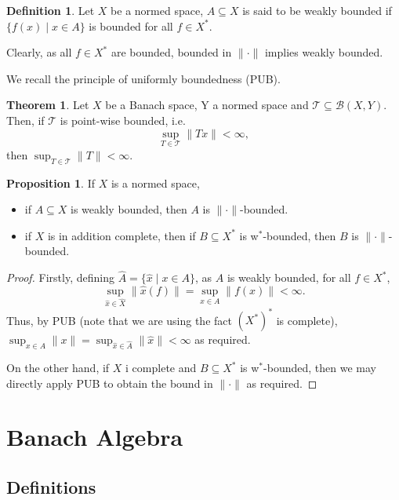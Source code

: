 \documentclass[]{article}
\theoremstyle{definition}
\newtheorem{theorem}{Theorem}
\newtheorem{definition}{Definition}[section]
\newtheorem{proposition}{Proposition}[section]
\begin{document}
\begin{definition}
  Let \(X\) be a normed space, \(A \subseteq X\) is said to be weakly bounded if 
  \(\{f(x) \mid x \in A\}\) is bounded for all \(f \in X^*\).
\end{definition}

Clearly, as all \(f \in X^*\) are bounded, bounded in \(\|\cdot\|\) implies weakly bounded.

We recall the principle of uniformly boundedness (PUB).

\begin{theorem}
  Let \(X\) be a Banach space, Y a normed space and \(\mathcal{T} \subseteq \mathcal{B}(X, Y)\). 
  Then, if \(\mathcal{T}\) is point-wise bounded, i.e. 
  \[\sup_{T \in \mathcal{T}} \|Tx\| < \infty,\]
  then \(\sup_{T \in \mathcal{T}} \|T\| < \infty\).
\end{theorem}

\begin{proposition}
  If \(X\) is a normed space, 
  \begin{itemize}
    \item if \(A \subseteq X\) is weakly bounded, then \(A\) is \(\|\cdot\|\)-bounded.
    \item if \(X\) is in addition complete, then if \(B \subseteq X^*\) is w\(^*\)-bounded, then 
      \(B\) is \(\|\cdot\|\)-bounded.
  \end{itemize}
\end{proposition}
\begin{proof}
  Firstly, defining \(\hat A = \{\hat x \mid x \in A\}\), as \(A\) is weakly bounded, for all 
  \(f \in X^*\), 
  \[\sup_{\hat x \in \hat X}\|\hat x(f)\| = \sup_{x \in A} \|f(x)\| < \infty.\]
  Thus, by PUB (note that we are using the fact \((X^*)^*\) is complete), 
  \(\sup_{x \in A} \|x\| = \sup_{\hat x \in \hat A} \|\hat x\| < \infty\) 
  as required. 
  
  On the other hand, if \(X\) i complete and \(B \subseteq X^*\) is w\(^*\)-bounded, then 
  we may directly apply PUB to obtain the bound in \(\|\cdot\|\) as required.
\end{proof}

\newpage
\section{Banach Algebra}

\subsection{Definitions}
\end{document}
